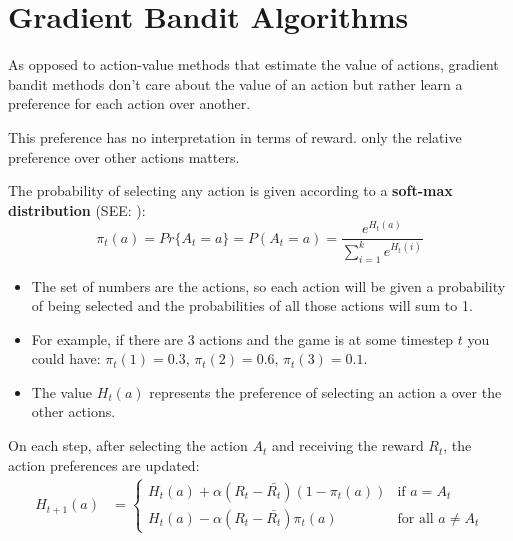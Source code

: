\section{Gradient Bandit Algorithms \cite{medium-numsmt2-rl-ch2-part-5}}\label{MAB: Gradient Bandit Algorithms}

As opposed to action-value methods that estimate the value of actions, gradient bandit methods don’t care about the value of an action but rather learn a preference for each action over another.

This preference has no interpretation in terms of reward. only the relative preference over other actions matters.

The probability of selecting any action is given according to a \textbf{soft-max distribution} (SEE: ):
\[
    \pi_t(a) = Pr\{A_t = a\} = P(A_t=a) = \displaystyle\frac{e^{H_t(a)}}{\sum_{i=1}^{k} e^{H_t(i)}}
\]

\begin{itemize}
    \item The set of numbers are the actions, so each action will be given a probability of being selected and the probabilities of all those actions will sum to 1.
    \item For example, if there are 3 actions and the game is at some timestep $t$ you could have: $\pi_t(1) = 0.3$, $\pi_t(2) = 0.6$, $\pi_t(3) = 0.1$.
    \item The value $H_t(a)$ represents the preference of selecting an action a over the other actions.
\end{itemize}

\vspace{0.2cm}

On each step, after selecting the action $A_t$ and receiving the reward $R_t$, the action preferences are updated:
\begin{align}
    H_{t+1}(a) &= 
    \begin{cases}
        H_t(a) + \alpha(R_t - \bar{R_t})(1-\pi_t(a)) & \text{if } a = A_t \\
        H_t(a) - \alpha(R_t - \bar{R_t})\pi_t(a) & \text{for all } a \neq A_t
    \end{cases}
\end{align}

